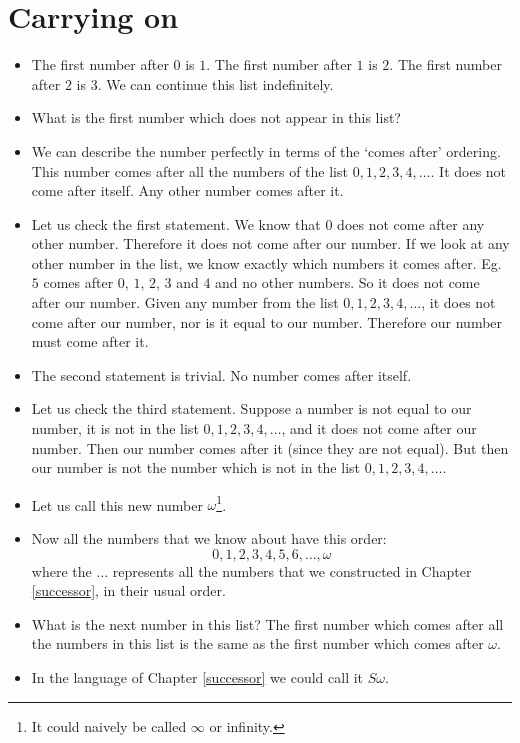 \chapter{Carrying on}
\label{carrying}

\begin{itemize}
\item
The first number after $0$ is $1$. The first number after $1$ is $2$. The first number after $2$ is $3$. We can continue this list indefinitely. 
\item
What is the first number which does not appear in this list?
\item
We can describe the number perfectly in terms of the `comes after' ordering. This number comes after all the numbers of the list $0,1,2,3,4,\ldots$. It does not come after itself. Any other number comes after it.
\item
Let us check the first statement. We know that $0$ does not come after any other number. Therefore it does not come after our number. If we look at any other number in the list, we know exactly which numbers it comes after. Eg. $5$ comes after $0$, $1$, $2$, $3$ and $4$ and no other numbers. So it does not come after our number. Given any number from the list $0,1,2,3,4,\ldots$, it does not come after our number, nor is it equal to our number. Therefore our number must come after it.
\item
The second statement is trivial. No number comes after itself.
\item
Let us check the third statement. Suppose a number is not equal to our number, it is not in the list $0,1,2,3,4,\ldots$, and it does not come after our number. Then our number comes after it (since they are not equal). But then our number is not the  number which is not in the list $0,1,2,3,4,\ldots$.
\item
Let us call this new number $\omega$\footnote{It could naively be called $\infty$ or infinity.}.
\item
Now all the numbers that we know about have this order:
\[ 0, 1, 2, 3, 4, 5, 6, \ldots, \omega \]
where the $\ldots$ represents all the numbers that we constructed in Chapter \ref{successor}, in their usual order.
\item
What is the next number in this list? The first number which comes after all the numbers in this list is the same as the first number which comes after $\omega$. 
\item
In the language of Chapter \ref{successor} we could call it $S\omega$.

\end{itemize}
